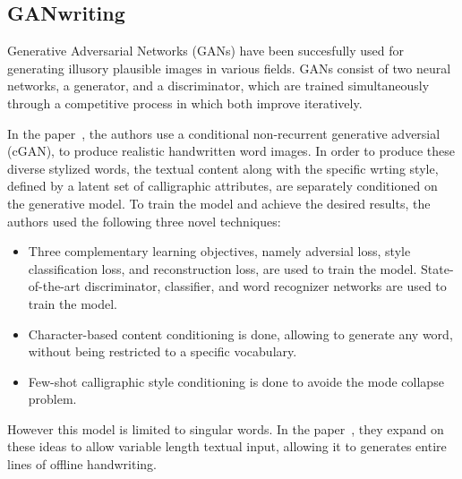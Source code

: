 \documentclass[10pt,twocolumn,letterpaper]{article}
\begin{document}
\subsection{GANwriting\cite{GAN-1, GAN-2}}
\label{subsec: GANWriting}
Generative Adversarial Networks (GANs) have been succesfully used for generating illusory plausible images in various fields. GANs consist of two neural networks, a generator, and a discriminator, which are trained simultaneously through a competitive process in which both improve iteratively. 

In the paper~\cite{GAN-1}, the authors use a conditional non-recurrent generative adversial (cGAN), to produce realistic handwritten word images. In order to produce these diverse stylized words, the textual content along with the specific wrting style, defined by a latent set of calligraphic attributes, are separately conditioned on the generative model. To train the model and achieve the desired results, the authors used the following three novel techniques:
\begin{itemize}
    \item Three complementary learning objectives, namely adversial loss, style classification loss, and reconstruction loss, are used to train the model. State-of-the-art discriminator, classifier, and word recognizer networks are used to train the model.
    \item Character-based content conditioning is done, allowing to generate any word, without being restricted to a specific vocabulary.
    \item Few-shot calligraphic style conditioning is done to avoide the mode collapse problem.
\end{itemize}


However this model is limited to singular words. In the paper~\cite{GAN-2}, they expand on these ideas to allow variable length  textual input, allowing it to generates entire lines of offline handwriting.
\end{document}
